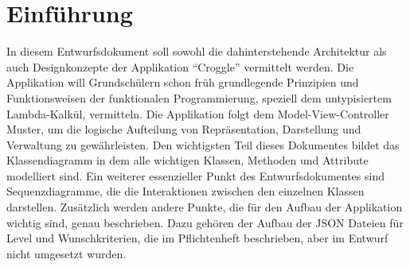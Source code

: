 \chapter{Einführung}

In diesem Entwurfsdokument soll sowohl die dahinterstehende Architektur als auch Designkonzepte der Applikation "`Croggle"' vermittelt werden.
Die Applikation will Grundschülern schon früh grundlegende Prinzipien und Funktionsweisen der funktionalen Programmierung, speziell dem untypisiertem Lambda-Kalkül, vermitteln.
Die Applikation folgt dem Model-View-Controller Muster, um die logische Aufteilung von Repräsentation, Darstellung und Verwaltung zu gewährleisten.
Den wichtigsten Teil dieses Dokumentes bildet das Klassendiagramm in dem alle wichtigen Klassen, Methoden und Attribute modelliert sind.
Ein weiterer essenzieller Punkt des Entwurfsdokumentes sind Sequenzdiagramme, die die Interaktionen zwischen den einzelnen Klassen darstellen.
Zusätzlich werden andere Punkte, die für den Aufbau der Applikation wichtig sind, genau beschrieben. Dazu gehören der Aufbau der JSON Dateien für Level und Wunschkriterien, die im Pflichtenheft beschrieben, aber im Entwurf nicht umgesetzt wurden.
